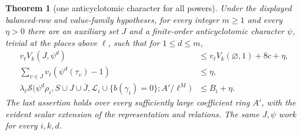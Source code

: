 \documentclass[11pt,a4paper]{article}
\newtheorem{theorem}{Theorem}[section]
\theoremstyle{definition}
\begin{document}
\begin{theorem}[one anticyclotomic character for all powers]
\label{thm:abstract-compatible-twist}
Under the displayed balanced-row and value-family
hypotheses, for every integer \(m\ge1\) and every
\(\eta>0\) there are an auxiliary set \(J\) and a
finite-order anticyclotomic character \(\psi\),
trivial at the places above \(\ell\), such that
for \(1\le d\le m\),
\begin{align}
 v_\ell V_k(J,\psi^d)
      &\le v_\ell V_k(\varnothing,1)+8c+\eta,
                              \label{eq:compatible-value}\\
 \sum_{v\in J}v_\ell(\psi^d(\tau_v)-1)
      &\le\eta,               \label{eq:compatible-conductor}\\
 \lambda_\ell\mathcal S\bigl(\psi^d\rho_i,
 S\cup J\cup\bar J,
 \mathcal L_i\cup\{b(\gamma_i)=0\};A'/\ell^M\bigr)
      &\le B_i+\eta .         \label{eq:compatible-selmer}
\end{align}
The last assertion holds over every sufficiently large
coefficient ring \(A'\), with the evident scalar
extension of the representation and relations.
The same \(J,\psi\) work for every \(i,k,d\).
\end{theorem}
\end{document}
